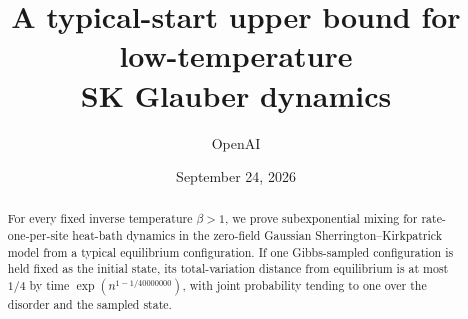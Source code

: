 \documentclass[11pt]{article}
\title{A typical-start upper bound for low-temperature\\SK Glauber dynamics}
\author{OpenAI}
\date{September 24, 2026}
\begin{document}
\maketitle
\begin{abstract}
For every fixed inverse temperature $\beta>1$, we prove subexponential
mixing for rate-one-per-site heat-bath dynamics in the zero-field Gaussian
Sherrington--Kirkpatrick model from a typical equilibrium configuration.
If one Gibbs-sampled configuration is held fixed as the initial state,
its total-variation distance from equilibrium is at most $1/4$ by time
$\exp(n^{1-1/40000000})$, with joint probability tending to one over
the disorder and the sampled state.
\end{abstract}

\tableofcontents





\FloatBarrier


\end{document}
